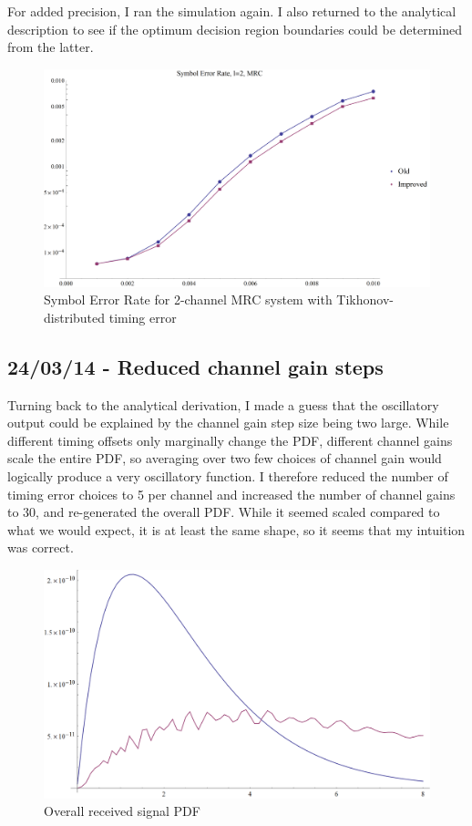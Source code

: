 For added precision, I ran the simulation again. I also returned to the
analytical description to see if the optimum decision region boundaries
could be determined from the latter.

\begin{figure}[htbp]
\centering
\includegraphics[width=\linewidth]{../../../plots/MRC_SER.png}
\caption{Symbol Error Rate for 2-channel MRC system with
Tikhonov-distributed timing error}
\end{figure}

\subsection{24/03/14 - Reduced channel gain steps}

Turning back to the analytical derivation, I made a guess that the oscillatory output could be explained by the channel gain step size being two large. While different timing offsets only marginally change the PDF, different channel gains scale the entire PDF, so averaging over two few choices of channel gain would logically produce a very oscillatory function. I therefore reduced the number of timing error choices to 5 per channel and increased the number of  channel gains to 30, and re-generated the overall PDF. While it seemed scaled compared to what we would expect, it is at least the same shape, so it seems that my intuition was correct.

\begin{figure}[htbp]
\centering
\includegraphics[width=\linewidth]{../../../plots/overall_test.png}
\caption{Overall received signal PDF}
\end{figure}

